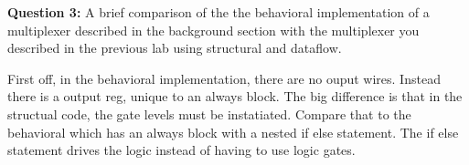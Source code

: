 \documentclass[a4paper,12pt]{article}
\begin{document}
\vspace{10pt}
\hspace{-15pt}\textbf{Question 3:} A brief comparison of the the behavioral implementation of a multiplexer described in the background
section with the multiplexer you described in the previous lab using structural and dataflow.

First off, in the behavioral implementation, there are no ouput wires. Instead there is a output reg, unique to an always block. The big difference is that in the structual code, the gate levels must be instatiated. Compare that to the behavioral which has an always block with a nested if else statement. The if else statement drives the logic instead of having to use logic gates. 
\end{document}
